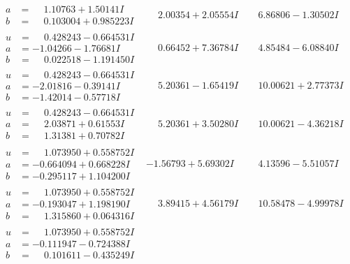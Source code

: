 \documentclass[1p]{elsarticle_modified}
\theoremstyle{definition}
\begin{document}
$$\begin{array}{c|c|c}
\begin{aligned}
a &= \phantom{-}1.10763 + 1.50141 I \\
b &= \phantom{-}0.103004 + 0.985223 I\end{aligned}
 & \phantom{-}2.00354 + 2.05554 I & \phantom{-}6.86806 - 1.30502 I \\ \hline\begin{aligned}
u &= \phantom{-}0.428243 - 0.664531 I \\
a &= -1.04266 - 1.76681 I \\
b &= \phantom{-}0.022518 - 1.191450 I\end{aligned}
 & \phantom{-}0.66452 + 7.36784 I & \phantom{-}4.85484 - 6.08840 I \\ \hline\begin{aligned}
u &= \phantom{-}0.428243 - 0.664531 I \\
a &= -2.01816 - 0.39141 I \\
b &= -1.42014 - 0.57718 I\end{aligned}
 & \phantom{-}5.20361 - 1.65419 I & \phantom{-}10.00621 + 2.77373 I \\ \hline\begin{aligned}
u &= \phantom{-}0.428243 - 0.664531 I \\
a &= \phantom{-}2.03871 + 0.61553 I \\
b &= \phantom{-}1.31381 + 0.70782 I\end{aligned}
 & \phantom{-}5.20361 + 3.50280 I & \phantom{-}10.00621 - 4.36218 I \\ \hline\begin{aligned}
u &= \phantom{-}1.073950 + 0.558752 I \\
a &= -0.664094 + 0.668228 I \\
b &= -0.295117 + 1.104200 I\end{aligned}
 & -1.56793 + 5.69302 I & \phantom{-}4.13596 - 5.51057 I \\ \hline\begin{aligned}
u &= \phantom{-}1.073950 + 0.558752 I \\
a &= -0.193047 + 1.198190 I \\
b &= \phantom{-}1.315860 + 0.064316 I\end{aligned}
 & \phantom{-}3.89415 + 4.56179 I & \phantom{-}10.58478 - 4.99978 I \\ \hline\begin{aligned}
u &= \phantom{-}1.073950 + 0.558752 I \\
a &= -0.111947 - 0.724388 I \\
b &= \phantom{-}0.101611 - 0.435249 I\end{aligned}

\end{array}$$
\end{document}
